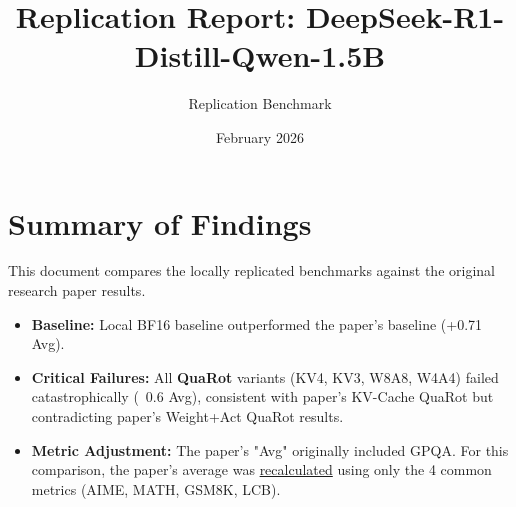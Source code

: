 \documentclass{article}
\title{Replication Report: DeepSeek-R1-Distill-Qwen-1.5B}
\author{Replication Benchmark}
\date{February 2026}
\begin{document}
\maketitle

\section*{Summary of Findings}
This document compares the locally replicated benchmarks against the original research paper results. 
\begin{itemize}
    \item \textbf{Baseline:} Local BF16 baseline outperformed the paper's baseline (+0.71 Avg).
    \item \textbf{Critical Failures:} All \textbf{QuaRot} variants (KV4, KV3, W8A8, W4A4) failed catastrophically (~0.6 Avg), consistent with paper's KV-Cache QuaRot but contradicting paper's Weight+Act QuaRot results.
    \item \textbf{Metric Adjustment:} The paper's "Avg" originally included GPQA. For this comparison, the paper's average was \underline{recalculated} using only the 4 common metrics (AIME, MATH, GSM8K, LCB).
\end{itemize}
\end{document}
